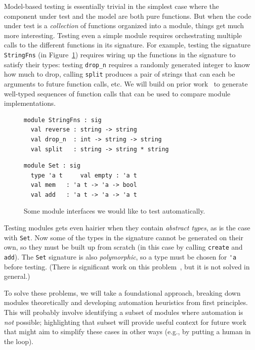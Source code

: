 Model-based testing is essentially trivial in the simplest case where
the component under test and the model are both pure functions.  But
when the code under test is a {\em
  collection} of functions
organized into a module, things get much more interesting. Testing even a simple
module requires orchestrating multiple calls to the different functions in
its signature. For example, testing the signature \lstinline{StringFns} (in
Figure~\ref{fig:sigs}) requires wiring up the functions in the
signature to satisfy their types: testing \lstinline{drop_n} requires a randomly generated
integer to know how much to drop, calling \lstinline{split} produces a pair of strings
that can each be arguments to future function calls, etc. We will build on prior
work~\cite{hughes_experiences_2016} to generate well-typed sequences of function
calls that can be used to compare module implementations.

\begin{figure}[t]
  \begin{minipage}{.45\textwidth}
\begin{lstlisting}
module StringFns : sig
  val reverse : string -> string
  val drop_n  : int -> string -> string
  val split   : string -> string * string
\end{lstlisting}
  \end{minipage}
  \qquad\qquad
  \begin{minipage}{.45\textwidth}
\begin{lstlisting}
module Set : sig
  type 'a t     val empty : 'a t
  val mem   : 'a t -> 'a -> bool
  val add   : 'a t -> 'a -> 'a t
\end{lstlisting}
  \end{minipage}
  \vspace{-2mm}
  \caption{Some module interfaces we would like to test
    automatically.}\label{fig:sigs}
\end{figure}

Testing modules gets even hairier when they contain {\em abstract types}, as is
the case with \lstinline{Set}. Now some of the types in the signature cannot be
generated on their own, so they must be built up from scratch (in this case by
calling \lstinline{create} and \lstinline{add}). The \lstinline{Set} signature is
also {\em polymorphic}, so a type must be chosen for \lstinline{'a} before
testing. (There is significant work on this
problem~\cite{hou_favonia_logarithm_2022}, but it is not solved in general.)

To solve these problems, we will take a foundational approach, breaking down
modules theoretically and developing automation heuristics from first
principles. This will probably\iflater{}\fi{} involve identifying a subset of
modules where automation is {\em not} possible; highlighting that subset will
provide useful context for future work that might aim to simplify these cases in
other ways (e.g., by putting a human in the loop).

